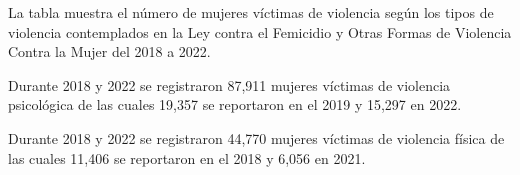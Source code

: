 La tabla muestra el número de mujeres víctimas de violencia según los tipos de violencia contemplados en la Ley contra el Femicidio y Otras Formas de Violencia Contra la Mujer del 2018 a 2022. 

Durante 2018 y 2022 se registraron 87,911 mujeres víctimas de violencia psicológica de las cuales 19,357 se reportaron en el 2019 y 15,297 en 2022. 

Durante 2018 y 2022 se registraron 44,770 mujeres víctimas de violencia física de las cuales 11,406 se reportaron en el 2018 y 6,056 en 2021. 
